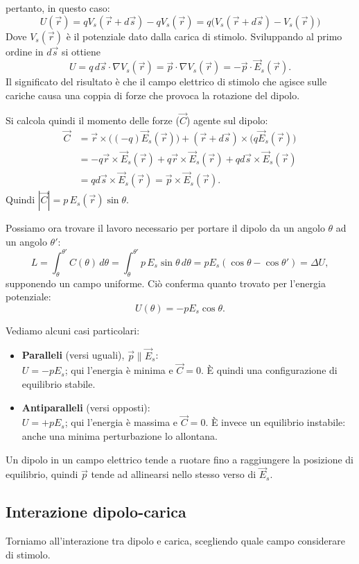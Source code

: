 \documentclass{book}
\begin{document}
pertanto, in questo caso:
\[
U(\vec{r})= qV_s(\vec{r}+d\vec{s})- q V_s(\vec{r}) =  q\bigl(V_s(\vec{r}+d\vec{s})- V_s(\vec{r})\bigr)
\]
Dove $V_s(\vec{r})$ è il potenziale dato dalla carica di stimolo.
Sviluppando al primo ordine in $d\vec{s}$ si ottiene
\[
U = q\,d\vec{s}\cdot \nabla V_s(\vec{r}) = \vec{p}\cdot \nabla V_s(\vec{r}) = -\vec{p}\cdot\vec{E}_s(\vec{r}).
\]
Il significato del risultato è che il campo elettrico di stimolo che agisce sulle cariche causa una coppia di forze che provoca la rotazione del dipolo.

Si calcola quindi il momento delle forze ($\vec{C}$) agente sul dipolo:
\begin{align*}
\vec{C}
&= \vec{r}\times\bigl((-q)\vec{E}_s(\vec{r})\bigr) + (\vec{r} + d\vec{s})\times\bigl(q\vec{E}_s(\vec{r})\bigr) \\
&= -q\vec{r}\times\vec{E}_s(\vec{r}) + q\vec{r}\times\vec{E}_s(\vec{r}) + qd\vec{s}\times \vec{E}_s(\vec{r}) \\
&= qd\vec{s}\times\vec{E}_s(\vec{r}) = \vec{p}\times\vec{E}_s(\vec{r}).
\end{align*}
Quindi $|\vec{C}|=p\,E_s(\vec{r})\sin\theta$.

Possiamo ora trovare il lavoro necessario per portare il dipolo da un angolo $\theta$ ad un angolo $\theta'$:
\[
L = \int_\theta^{\theta'} C(\theta)\,d\theta = \int_\theta^{\theta'} p\,E_s\sin\theta\,d\theta
= pE_s(\cos\theta-\cos\theta') = \Delta U,
\]
supponendo un campo uniforme. Ciò conferma quanto trovato per l'energia potenziale:
\[
U(\theta) = -pE_s\cos\theta.
\]

Vediamo alcuni casi particolari:
\begin{itemize}
    \item \textbf{Paralleli} (versi uguali), $\vec{p}\parallel\vec{E}_s$:\\
    $U=-pE_s$; qui l'energia è minima e $\vec{C}=0$. È quindi una configurazione di equilibrio stabile.
    \item \textbf{Antiparalleli} (versi opposti):\\
    $U=+pE_s$; qui l'energia è massima e $\vec{C}=0$. È invece un equilibrio instabile: anche una minima perturbazione lo allontana.
\end{itemize}

Un dipolo in un campo elettrico tende a ruotare fino a raggiungere la posizione di equilibrio, quindi $\vec{p}$ tende ad allinearsi nello stesso verso di $\vec{E}_s$.


\subsection{Interazione dipolo-carica}
Torniamo all'interazione tra dipolo e carica, scegliendo quale campo considerare di stimolo.
\end{document}
